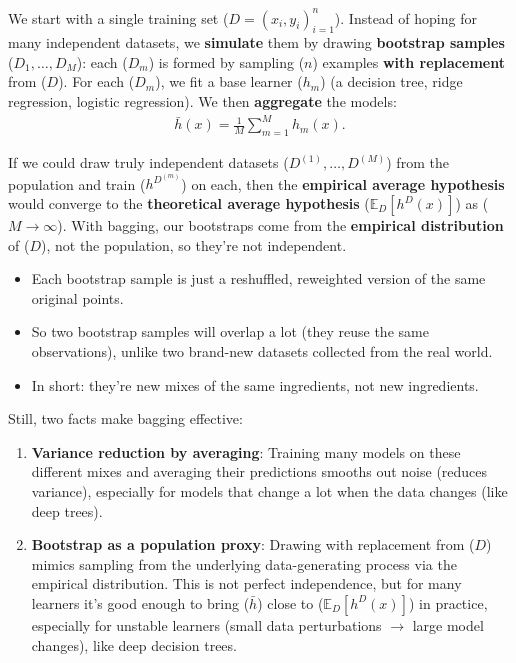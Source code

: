We start with a single training set ($D={(x_i,y_i)}_{i=1}^n$). Instead of hoping for many independent datasets, we \textbf{simulate} them by drawing \textbf{bootstrap samples} ($D_1,\dots,D_M$): each ($D_m$) is formed by sampling ($n$) examples \textbf{with replacement} from ($D$). For each ($D_m$), we fit a base learner ($h_m$) (\eg a decision tree, ridge regression, logistic regression). We then \textbf{aggregate} the models:
\begin{align*}
	\bar{h}(x)=\frac{1}{M}\sum_{m=1}^{M}h_m(x).
\end{align*}

If we could draw truly independent datasets ($D^{(1)},\dots,D^{(M)}$) from the population and train ($h^{D^{(m)}}$) on each, then the \textbf{empirical average hypothesis} would converge to the \textbf{theoretical average hypothesis} ($\mathbb{E}_D[h^D(x)]$) as ($M\to\infty$). With bagging, our bootstraps come from the \textbf{empirical distribution} of ($D$), not the population, so they're not independent. 

\begin{itemize}
	\item Each bootstrap sample is just a reshuffled, reweighted version of the same original points.
	\item So two bootstrap samples will overlap a lot (they reuse the same observations), unlike two brand-new datasets collected from the real world.
	\item In short: they're new mixes of the same ingredients, not new ingredients.
\end{itemize}

Still, two facts make bagging effective:
\begin{enumerate}
	\item \textbf{Variance reduction by averaging}: Training many models on these different mixes and averaging their predictions smooths out noise (reduces variance), especially for models that change a lot when the data changes (like deep trees).
	\item \textbf{Bootstrap as a population proxy}: Drawing with replacement from ($D$) mimics sampling from the underlying data-generating process via the empirical distribution. This is not perfect independence, but for many learners it's good enough to bring ($\bar h$) close to ($\mathbb{E}_D[h^D(x)]$) in practice, especially for unstable learners (small data perturbations $\to$ large model changes), like deep decision trees.
\end{enumerate}

